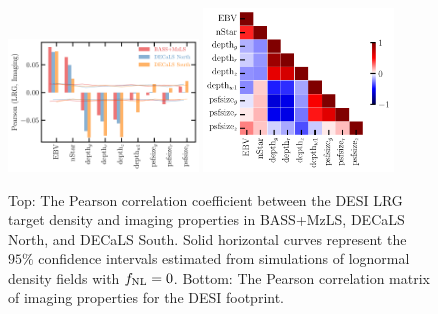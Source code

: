 \begin{figure}
\centering
 \includegraphics[width=0.45\textwidth]{figures/pcc.pdf} 
 \includegraphics[width=0.45\textwidth]{figures/pccx.pdf}  
 \caption{Top: The Pearson correlation coefficient between the DESI LRG target density and imaging properties in BASS+MzLS, DECaLS North, and DECaLS South. Solid horizontal curves represent the $95\%$ confidence intervals estimated from simulations of lognormal density fields with $f_{\rm NL}=0$. Bottom: The Pearson correlation matrix of imaging properties for the DESI footprint.}
 \label{fig:pcc}
\end{figure}

